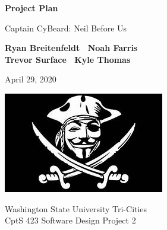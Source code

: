 \begin{titlepage}
    \begin{center}
        \vspace*{1cm}

        \Huge
        \textbf{Project Plan}

        \vspace{.5cm}
        \LARGE
        Captain CyBeard: Neil Before Us

        \vspace{1cm}

        \textbf{Ryan Breitenfeldt \textbar\ Noah Farris\\ Trevor Surface \textbar\ Kyle Thomas}

        \vspace{.2cm}
        \Large
        April 29, 2020

        \vspace{2cm}
        \includegraphics[scale=1]{logo}

        \vfill

        Washington State University Tri-Cities\\
        CptS 423 Software Design Project 2

    \end{center}
\end{titlepage}

